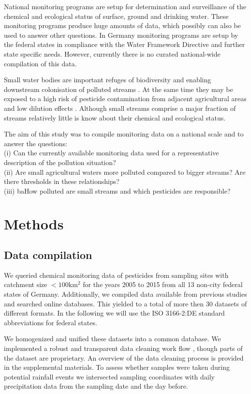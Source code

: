 \documentclass[journal=esthag,manuscript=article]{achemso}
\begin{document}
National monitoring programs are setup for determination and surveillance of the chemical and ecological status of surface, ground and drinking water.
These monitoring programs produce huge amounts of data, which possibly can also be used to answer other questions.
In Germany monitoring programs are setup by the federal states in compliance with the Water Framework Directive \citep{quevauviller_water_2008} and further state specific needs.
However, currently there is no curated national-wide compilation of this data.

Small water bodies are important refuges of biodiversity \citep{davies_comparison_2008} and enabling downstream colonisation of polluted streams \citep{liess_analyzing_2005}.
At the same time they may be exposed to a high risk of pesticide contamination from adjacent agricultural areas and low dilution effects \citep{liess_determination_1999}.
Although small streams comprise a major fraction of streams \citep{nadeau_hydrological_2007} relatively little is know about their chemical and ecological status.

The aim of this study was to compile monitoring data on a national scale and to answer the questions: \\
(i) Can the currently available monitoring data used for a representative description of the pollution situation? \\
(ii) Are small agricultural waters more polluted compared to bigger streams? Are there thresholds in these relationships? \\
(iii) baHow polluted are small streams and which pesticides are responsible?


\section{Methods}
\subsection{Data compilation}

We queried chemical monitoring data of pesticides from sampling sites with catchment size $\mathrm{< 100km^2}$ for the years 2005 to 2015 from all 13 non-city federal states of Germany.
Additionally, we compiled data available from previous studies and searched online databases.
This yielded to a total of more then 30 datasets of different formats.
In the following we will use the ISO 3166-2:DE standard abbreviations for federal states.

We homogenized and unified these datasets into a common database.
We implemented a robust and transparent data cleaning work flow \citep{poisot_best_2015}, though parts of the dataset are proprietary.
An overview of the data cleaning process is provided in the supplemental materials.  
To assess whether samples were taken during potential rainfall events we intersected sampling coordinates with daily precipitation data \citep{rauthe_central_2013} from the sampling date and the day before.
\end{document}
